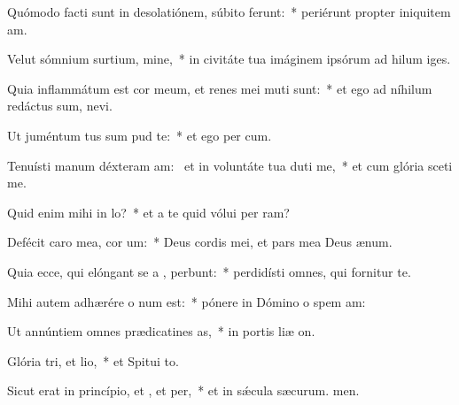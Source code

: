 \item Quómodo facti sunt in desolatiónem, súbito ferunt:~* periérunt propter iniquitem am.
\item Velut sómnium surtium, mine,~* in civitáte tua imáginem ipsórum ad hilum iges.
\item Quia inflammátum est cor meum, et renes mei muti sunt:~* et ego ad níhilum redáctus sum,  nevi.
\item Ut juméntum tus sum pud te:~* et ego per cum.
\item Tenuísti manum déxteram am:~\pscross{} et in voluntáte tua duti me,~* et cum glória sceti me.
\item Quid enim mihi  in lo?~* et a te quid vólui per ram?
\item Defécit caro mea,  cor um:~* Deus cordis mei, et pars mea Deus  ænum.
\item Quia ecce, qui elóngant se a , perbunt:~* perdidísti omnes, qui fornitur  te.
\item Mihi autem adhærére o num est:~* pónere in Dómino o spem am:
\item Ut annúntiem omnes prædicatines as,~* in portis liæ on.
\item Glória tri, et lio,~* et Spitui to.
\item Sicut erat in princípio, et , et per,~* et in sǽcula sæcurum. men.
